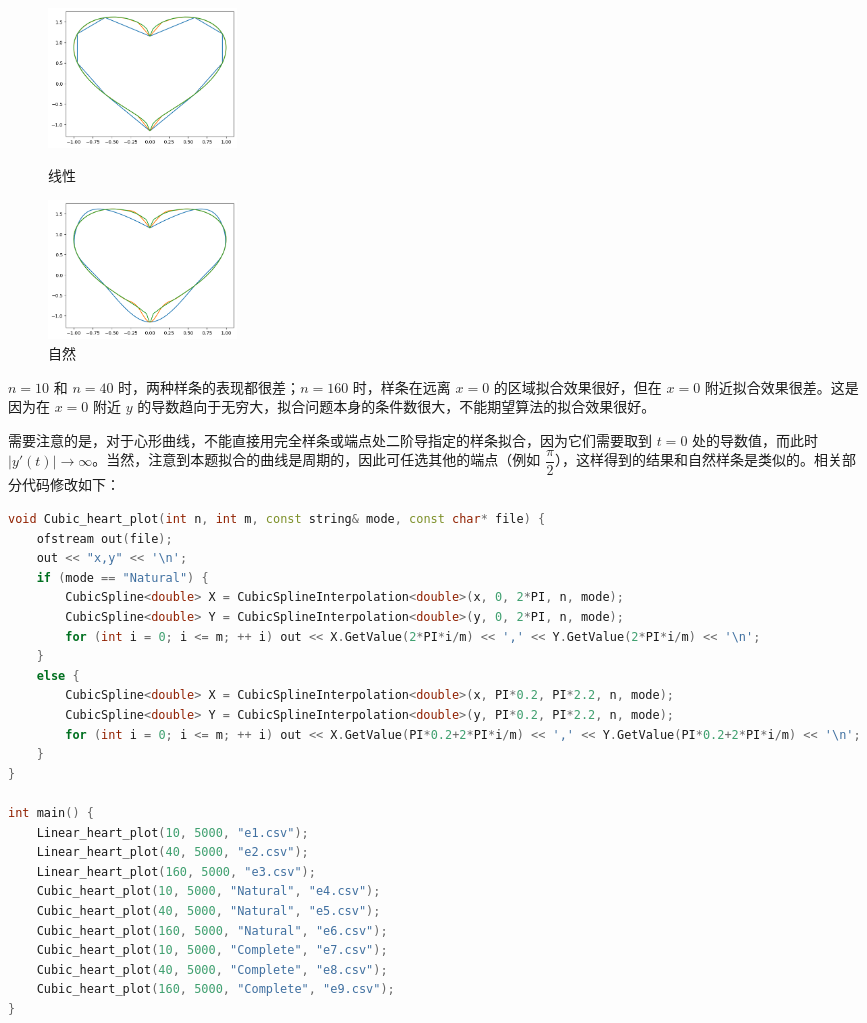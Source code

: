 \documentclass{ctexart}
\begin{document}
\begin{figure}[htbp]
\centering
\begin{minipage}{5cm}
    \centering
    \includegraphics[width=5cm]{e1.png}
    \caption{线性}
    \label{e1}
\end{minipage}
\qquad
\begin{minipage}{5cm}
    \centering
    \includegraphics[width=5cm]{e2.png}
    \caption{自然}
    \label{e2}
\end{minipage}
\end{figure}

$n=10$ 和 $n=40$ 时，两种样条的表现都很差；$n=160$ 时，样条在远离 $x=0$ 的区域拟合效果很好，但在 $x=0$ 附近拟合效果很差。这是因为在 $x=0$ 附近 $y$ 的导数趋向于无穷大，拟合问题本身的条件数很大，不能期望算法的拟合效果很好。

需要注意的是，对于心形曲线，不能直接用完全样条或端点处二阶导指定的样条拟合，因为它们需要取到 $t=0$ 处的导数值，而此时 $|y'(t)|\rightarrow \infty$。当然，注意到本题拟合的曲线是周期的，因此可任选其他的端点（例如 $\dfrac \pi 2$），这样得到的结果和自然样条是类似的。相关部分代码修改如下：

\begin{lstlisting}[language={c++}]
void Cubic_heart_plot(int n, int m, const string& mode, const char* file) {
	ofstream out(file);
	out << "x,y" << '\n';
	if (mode == "Natural") {
		CubicSpline<double> X = CubicSplineInterpolation<double>(x, 0, 2*PI, n, mode);
		CubicSpline<double> Y = CubicSplineInterpolation<double>(y, 0, 2*PI, n, mode);
		for (int i = 0; i <= m; ++ i) out << X.GetValue(2*PI*i/m) << ',' << Y.GetValue(2*PI*i/m) << '\n';
	}
	else {
		CubicSpline<double> X = CubicSplineInterpolation<double>(x, PI*0.2, PI*2.2, n, mode);
		CubicSpline<double> Y = CubicSplineInterpolation<double>(y, PI*0.2, PI*2.2, n, mode);
		for (int i = 0; i <= m; ++ i) out << X.GetValue(PI*0.2+2*PI*i/m) << ',' << Y.GetValue(PI*0.2+2*PI*i/m) << '\n';
	}
}

int main() {
	Linear_heart_plot(10, 5000, "e1.csv");
	Linear_heart_plot(40, 5000, "e2.csv");
	Linear_heart_plot(160, 5000, "e3.csv");
	Cubic_heart_plot(10, 5000, "Natural", "e4.csv");
	Cubic_heart_plot(40, 5000, "Natural", "e5.csv");
	Cubic_heart_plot(160, 5000, "Natural", "e6.csv");
	Cubic_heart_plot(10, 5000, "Complete", "e7.csv");
	Cubic_heart_plot(40, 5000, "Complete", "e8.csv");
	Cubic_heart_plot(160, 5000, "Complete", "e9.csv");
}
\end{lstlisting}
\end{document}
